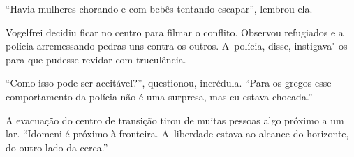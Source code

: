 ``Havia mulheres chorando e com bebês tentando escapar'', lembrou ela.

Vogelfrei decidiu ficar no centro para filmar o conflito. Observou
refugiados e a polícia arremessando pedras uns contra os outros. A~polícia, disse, instigava"-os para que pudesse revidar com truculência.

``Como isso pode ser aceitável?'', questionou, incrédula. ``Para os
gregos esse comportamento da polícia não é uma surpresa, mas eu estava
chocada.''

A evacuação do centro de transição tirou de muitas pessoas algo próximo
a um lar. ``Idomeni é próximo à fronteira. A~liberdade estava ao alcance
do horizonte, do outro lado da cerca.''
